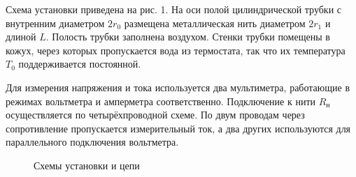 \documentclass[12pt, a4paper]{article}
\begin{document}
Схема установки приведена на рис. 1. На оси полой цилиндрической трубки с внутренним диаметром $2r_0$ размещена металлическая нить диаметром $2r_1$ и длиной $L$. Полость трубки заполнена воздухом. Стенки трубки помещены в кожух, через которых пропускается вода из термостата, так что их температура $T_0$ поддерживается постоянной.

Для измерения напряжения и тока используется два мультиметра, работающие в режимах вольтметра и амперметра соответственно. Подключение к нити $R_н$ осуществляется по четырёхпроводной схеме. По двум проводам через сопротивление пропускается измерительный ток, а два других используются для параллельного подключения вольтметра.

\begin{figure}[H]
\begin{minipage}[H]{0.5\linewidth}
\end{minipage}
\hfill
\begin{minipage}[H]{0.5\linewidth}
\end{minipage}
\caption{Схемы установки и цепи}
\label{ris:image1}
\end{figure}
\end{document}
